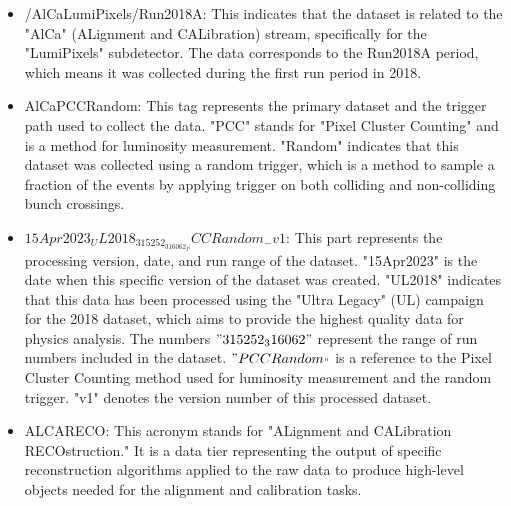\begin{itemize}

\item /AlCaLumiPixels/Run2018A: This indicates that the dataset is related to the "AlCa" (ALignment and CALibration) stream, specifically for the "LumiPixels" subdetector. The data corresponds to the Run2018A period, which means it was collected during the first run period in 2018.

\item AlCaPCCRandom: This tag represents the primary dataset and the trigger path used to collect the data. "PCC" stands for "Pixel Cluster Counting" and is a method for luminosity measurement. "Random" indicates that this dataset was collected using a random trigger, which is a method to sample a fraction of the events by applying trigger on both colliding and non-colliding bunch crossings.

\item $15Apr2023_UL2018_315252_316062_PCCRandom_-v1$: This part represents the processing version, date, and run range of the dataset. "15Apr2023" is the date when this specific version of the dataset was created. "UL2018" indicates that this data has been processed using the "Ultra Legacy" (UL) campaign for the 2018 dataset, which aims to provide the highest quality data for physics analysis. The numbers $"315252_316062"$ represent the range of run numbers included in the dataset. $"PCCRandom_"$ is a reference to the Pixel Cluster Counting method used for luminosity measurement and the random trigger. "v1" denotes the version number of this processed dataset.

\item ALCARECO:
This acronym stands for "ALignment and CALibration RECOstruction." It is a data tier representing the output of specific reconstruction algorithms applied to the raw data to produce high-level objects needed for the alignment and calibration tasks.

\end{itemize}





